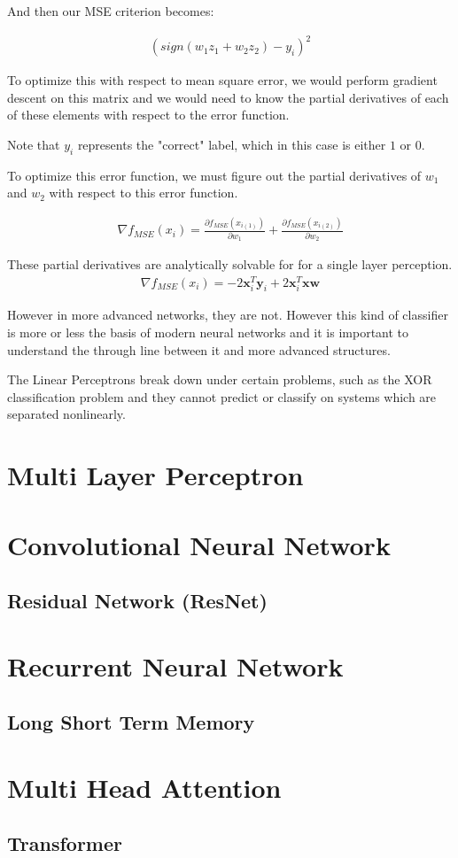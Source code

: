 \documentclass{article}
\begin{document}
And then our MSE criterion becomes:

\begin{align*}
(sign(w_1z_1 + w_2 z_2) - y_i)^2
\end{align*}

To optimize this with respect to mean square error, we would perform gradient descent on this matrix and we would need to know the partial derivatives of each of these elements with respect to the error function.

Note that $y_i$ represents the "correct" label, which in this case is either $1$ or $0$.

To optimize this error function, we must figure out the partial derivatives of $w_1$ and $w_2$ with respect to this error function.

\begin{align*}
\nabla f_{MSE}(x_i) = \frac{\partial f_{MSE}(x_{i(1)})}{\partial w_1} + \frac{\partial f_{MSE}(x_{i(2)})}{\partial w_2}
\end{align*}

These partial derivatives are analytically solvable for for a single layer perception.
\begin{align*}
\nabla f_{MSE}(x_i) = -2\mathbf{x}_i^T \mathbf{y}_i + 2\mathbf{x}_i^T \mathbf{x} \mathbf{w}
\end{align*}

However in more advanced networks, they are not. However this kind of classifier is more or less the basis of modern neural networks and it is important to understand the through line between it and more advanced structures.

The Linear Perceptrons break down under certain problems, such as the XOR classification problem and they cannot predict or classify on systems which are separated nonlinearly.



\section{Multi Layer Perceptron}


\section{Convolutional Neural Network}
\subsection{Residual Network (ResNet)}

\section{Recurrent Neural Network}

\subsection*{Long Short Term Memory}

\section{Multi Head Attention}

\subsection{Transformer}
\end{document}
